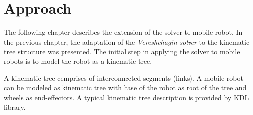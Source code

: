 
\chapter{Approach}

The following chapter describes the extension of the solver to mobile robot. In the previous chapter, the adaptation of the \textit{Vereshchagin solver} to the kinematic tree structure was presented. The initial step in applying the solver to mobile robots is to model the robot as a kinematic tree. 

A kinematic tree comprises of interconnected segments (links). A mobile robot can be modeled as kinematic tree with base of the robot as root of the tree and wheels as end-effectors. A typical kinematic tree description is provided by \hyperref[kdl]{KDL} library. 


